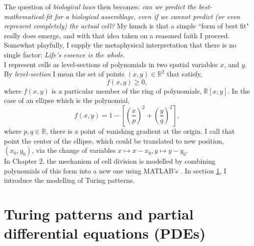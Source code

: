 The question of \textit{biological laws} 
then becomes: \textit{can we predict the best-mathematical-fit
for a biological assemblage, even if we cannot predict (or even 
represent completely) the actual cell?}
My hunch is that a simple ``form of best fit" really does emerge, 
and with that idea taken on a reasoned faith I proceed. Somewhat 
playfully, I supply the metaphysical interpretation that 
there is no single factor: 
\textit{Life's essence is the whole}.
\\

I represent cells as 
level-sections of polynomials in two spatial 
variables $x$, and $y$. By \textit{level-section} I mean the set of points 
$(x,y) \in \mathbb{R}^2$ that satisfy,
\begin{equation*}
    f(x,y) \geq 0,
\end{equation*}
where $f(x,y)$ is a particular member of the ring of polynomials, $\mathbb{R}[x,y]$.
In the case of an ellipse which is the polynomial, 
\begin{equation*}
    f(x,y) = 1 - \left[\left( \frac{x}{p}\right)^2 + \left( \frac{y}{q}\right)^2\right],
\end{equation*}
where $p,q \in \mathbb{R}$, there is a point of vanishing gradient at the origin. I call 
that point the center of the ellipse, which could be translated 
to new position, $(x_0,y_0)$, via the change of variables $x \mapsto x-x_0, y \mapsto y-y_0.$
\\

In Chapter 2, the mechanism of cell division is modelled by 
combining polynomials of this form into a new one using MATLAB's . 
In section \ref{sec:turingPatterns}, 
I introduce the modelling of Turing patterns.


\section{Turing patterns and partial differential equations (PDEs)} \label{sec:turingPatterns}






